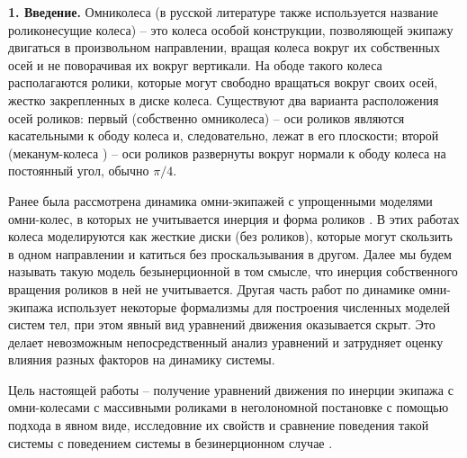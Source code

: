 {\bf 1. Введение.}
Омниколеса (в русской литературе также используется название роликонесущие колеса) -- это колеса особой конструкции, позволяющей экипажу двигаться в произвольном направлении, вращая колеса вокруг их собственных осей и не поворачивая их вокруг вертикали. На ободе такого колеса располагаются ролики, которые могут свободно вращаться вокруг своих осей, жестко закрепленных в диске колеса. Существуют два варианта расположения осей роликов: первый  (собственно омниколеса) -- оси роликов являются касательными к ободу колеса и, следовательно, лежат в его плоскости; второй (меканум-колеса \cite{mecanum}) -- оси роликов развернуты вокруг нормали к ободу колеса на постоянный угол, обычно $\pi/4$.

Ранее была рассмотрена динамика омни-экипажей с упрощенными моделями омни-колес, в которых не учитывается инерция и форма роликов \cite{ZobovaTatarinovPMM, formalskii, borisov, 5to9FromZobova2011}. В этих работах колеса моделируются как жесткие диски (без роликов), которые могут скользить в одном направлении и катиться без проскальзывания в другом. Далее мы будем называть такую модель безынерционной в том смысле, что инерция собственного вращения роликов в ней не учитывается. Другая часть работ по динамике омни-экипажа \cite{KosenkoGerasimov, Tobolar, 3to4FromZobova2011} использует некоторые формализмы для построения численных моделей систем тел, при этом явный вид уравнений движения оказывается скрыт. Это делает невозможным непосредственный  анализ уравнений и затрудняет оценку влияния разных факторов на динамику системы.


Цель настоящей работы -- получение уравнений движения по инерции экипажа с омни-колесами с массивными роликами в неголономной постановке с помощью подхода \cite{Tatarinov} в явном виде, исследовние их свойств и сравнение поведения такой системы с поведением системы в безинерционном случае \cite{Zobova2011}.